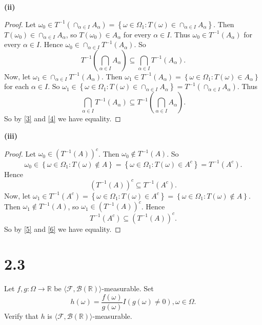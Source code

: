\documentclass[12pt]{article}
\begin{document}
{\bf (ii)}
\begin{proof}
Let $\omega_{0} \in T^{-1}\left( \cap_{\alpha \in I}A_{\alpha} \right) = \left\{ \omega \in \Omega_{1} : T(\omega) \in \cap_{\alpha \in I}A_{\alpha}
\right\}$. Then $T(\omega_0) \in \cap_{\alpha \in I}A_\alpha$, so $T(\omega_0) \in A_{\alpha}$ for every $\alpha \in I$. Thus $\omega_0 \in
T^{-1}(A_\alpha)$ for every $\alpha \in I$. Hence $\omega_0 \in \cap_{\alpha\in I}T^{-1}(A_\alpha)$. So 
\begin{equation}
T^{-1}\left( \bigcap_{\alpha\in I}A_{\alpha} \right) \subseteq \bigcap_{\alpha\in I}T^{-1}(A_\alpha).
\label{3}
\end{equation}
Now, let $\omega_{1} \in \cap_{\alpha\in I}T^{-1}(A_\alpha)$. Then $\omega_1 \in T^{-1}(A_\alpha) = \left\{ \omega \in \Omega_1 : T(\omega) \in
A_\alpha \right\}$ for each $\alpha \in I$. So $\omega_1 \in \left\{ \omega \in \Omega_1 : T(\omega) \in \cap_{\alpha \in I}A_\alpha \right\} =
T^{-1}\left( \cap_{\alpha \in I}A_\alpha \right)$. Thus 
\begin{equation}
\bigcap_{\alpha \in I}T^{-1}(A_\alpha) \subseteq T^{-1}\left( \bigcap_{\alpha\in I}A_\alpha \right).
\label{4}
\end{equation}
So by \ref{3} and \ref{4} we have equality.
\end{proof}

{\bf (iii)}
\begin{proof}
Let $\omega_0 \in \left( T^{-1}(A) \right)^{c}$. Then $\omega_0 \notin T^{-1}(A)$. So 
\[ \omega_0 \in \left\{ \omega \in \Omega_1 : T(\omega) \notin A \right\} =  \left\{ \omega \in \Omega_1 : T(\omega) \in A^{c} \right\} =
T^{-1}(A^{c}). \]
Hence 
\begin{equation}
\left( T^{-1}(A) \right)^{c} \subseteq T^{-1}(A^{c}).
\label{5}
\end{equation}
Now, let $\omega_1 \in T^{-1}(A^{c}) = \left\{ \omega\in \Omega_1 : T(\omega) \in A^{c} \right\} = \left\{ \omega \in \Omega_1 : T(\omega) \notin A
\right\}$. Then $\omega_1 \notin T^{-1}(A)$, so $\omega_1 \in \left( T^{-1}(A) \right)^{c}$. Hence 
\begin{equation}
T^{-1}(A^{c}) \subseteq \left( T^{-1}(A) \right)^{c}.
\label{6}
\end{equation}
So by \ref{5} and \ref{6} we have equality.
\end{proof}



\newpage
\section*{2.3}
Let $f, g : \Omega \rightarrow \mathbb{R}$ be $\langle\mathcal{F}, \mathcal{B}(\mathbb{R})\rangle$-measurable. Set 
\[ h(\omega) = \frac{f(\omega)}{g(\omega)}I(g(\omega)\neq 0), \omega \in \Omega. \]
Verify that $h$ is $\langle\mathcal{F}, \mathcal{B}(\mathbb{R})\rangle$-measurable.
\end{document}
